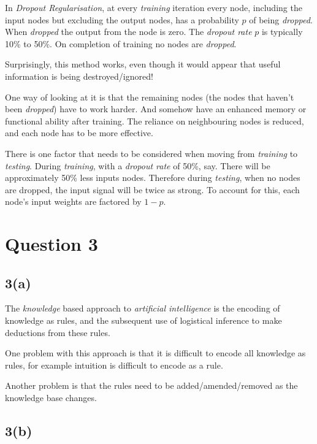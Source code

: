 \documentclass[12pt, a4paper,reqno]{article}
\begin{document}
In \emph{Dropout Regularisation}, at every \emph{training} iteration every node, including the input nodes but excluding the output nodes, has a probability $p$ of being \emph{dropped}. When \emph{dropped} the output from the node is zero. The \emph{dropout rate} $p$ is typically 10\% to 50\%. On completion of training no nodes are \emph{dropped}.

Surprisingly, this method works, even though it would appear that useful information is being destroyed/ignored!

One way of looking at it is that the remaining nodes (the nodes that haven't been \emph{dropped}) have to work harder. And somehow have an enhanced memory or functional ability after training. The reliance on neighbouring nodes is reduced, and each node has to be more effective.

There is one factor that needs to be considered when moving from \emph{training} to \emph{testing}. During \emph{training}, with a \emph{dropout rate} of 50\%, say. There will be approximately 50\% less inputs nodes. Therefore during \emph{testing}, when no nodes are dropped, the input signal will be twice as strong. To account for this, each node's input weights are factored by $1 - p$. 




%
%
\clearpage\section*{Question 3}

\subsection*{3(a)}
The \emph{knowledge} based approach to \emph{artificial intelligence} is the encoding of knowledge as rules, and the subsequent use of logistical inference to make deductions from these rules.

One problem with this approach is that it is difficult to encode all knowledge as rules, for example intuition is difficult to encode as a rule.

Another problem is that the rules need to be added/amended/removed as the knowledge base changes.

\subsection*{3(b)}
\end{document}
